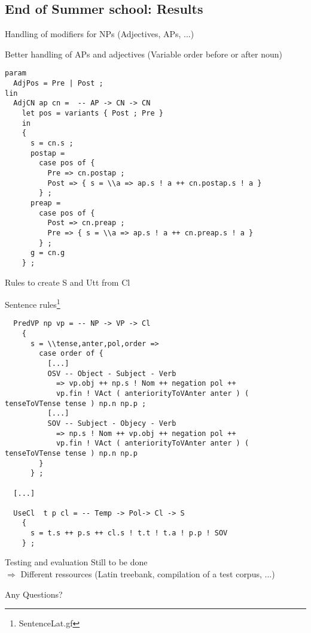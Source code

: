 \documentclass{beamer}
\begin{document}
\subsection{End of Summer school: Results}
\begin{frame}[fragile]{Handling of modifiers for NPs (Adjectives, APs, ...)}
\begin{example}{Better handling of APs and adjectives (Variable order before or after noun)}
\begin{Verbatim}
param
  AdjPos = Pre | Post ;
lin
  AdjCN ap cn =  -- AP -> CN -> CN
    let pos = variants { Post ; Pre }
    in
    {
      s = cn.s ;
      postap = 
        case pos of { 
          Pre => cn.postap ; 
          Post => { s = \\a => ap.s ! a ++ cn.postap.s ! a } 
        } ;
      preap = 
        case pos of { 
          Post => cn.preap ;
          Pre => { s = \\a => ap.s ! a ++ cn.preap.s ! a }          
        } ;
      g = cn.g
    } ;
\end{Verbatim}
\end{example}
\end{frame}
\begin{frame}[fragile]{Rules to create S and Utt from Cl}
\begin{example}{Sentence rules\footnote{SentenceLat.gf}}
\begin{Verbatim}
  PredVP np vp = -- NP -> VP -> Cl
    {
      s = \\tense,anter,pol,order => 
        case order of {
          [...]
          OSV -- Object - Subject - Verb 
            => vp.obj ++ np.s ! Nom ++ negation pol ++ 
            vp.fin ! VAct ( anteriorityToVAnter anter ) ( tenseToVTense tense ) np.n np.p ;
          [...]
          SOV -- Subject - Objecy - Verb
            => np.s ! Nom ++ vp.obj ++ negation pol ++ 
            vp.fin ! VAct ( anteriorityToVAnter anter ) ( tenseToVTense tense ) np.n np.p 
        } 
      } ;

  [...]
  
  UseCl  t p cl = -- Temp -> Pol-> Cl -> S
    {
      s = t.s ++ p.s ++ cl.s ! t.t ! t.a ! p.p ! SOV 
    } ;
\end{Verbatim}
\end{example}
\end{frame}
\begin{frame}{Testing and evaluation}
Still to be done \\
$\Rightarrow$ Different ressources (Latin treebank, compilation of a test corpus, ...)
\end{frame}
\begin{frame}
{\huge Any Questions?}
\end{frame}
\end{document}
